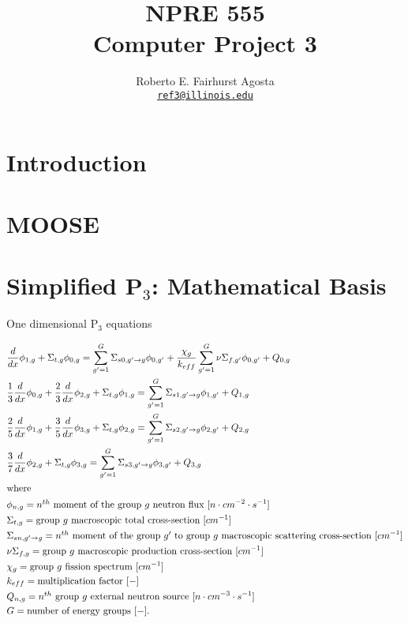 \documentclass[letterpaper]{article}
\author{Roberto E. Fairhurst Agosta
        \\ \href{mailto:ref3@illinois.edu}{\texttt{ref3@illinois.edu}}
}
\title{NPRE 555\\ Computer Project 3}
\begin{document}
\begin{titlepage}
\maketitle
\thispagestyle{empty}
\end{titlepage}

\section{Introduction}

\section{MOOSE}

\section{Simplified P$_3$: Mathematical Basis}

One dimensional P$_3$ equations
\cite{brantley_simplifiedP3_2000}

\begin{align}
    & \frac{d}{dx} \phi_{1,g} + \Sigma_{t,g} \phi_{0,g} = \sum_{g'=1}^G \Sigma_{s0,g' \rightarrow g} \phi_{0,g'} + \frac{\chi_g}{k_{eff}} \sum_{g'=1}^G \nu\Sigma_{f,g'} \phi_{0,g'} + Q_{0,g}  \label{eq:SP3-0} \\
    & \frac{1}{3} \frac{d}{dx} \phi_{0,g} + \frac{2}{3}\frac{d}{dx}\phi_{2,g} + \Sigma_{t,g} \phi_{1,g} = \sum_{g'=1}^G \Sigma_{s1,g' \rightarrow g} \phi_{1,g'} + Q_{1,g} \label{eq:SP3-1} \\
    & \frac{2}{5} \frac{d}{dx}\phi_{1,g} + \frac{3}{5}\frac{d}{dx}\phi_{3,g} + \Sigma_{t,g} \phi_{2,g} = \sum_{g'=1}^G \Sigma_{s2,g' \rightarrow g} \phi_{2,g'} + Q_{2,g} \label{eq:SP3-2} \\
    & \frac{3}{7}\frac{d}{dx}\phi_{2,g} + \Sigma_{t,g} \phi_{3,g} = \sum_{g'=1}^G \Sigma_{s3,g' \rightarrow g} \phi_{3,g'} + Q_{3,g} \label{eq:P3-3} \\
    \intertext{where}
    & \phi_{n,g} = \mbox{$n^{th}$ moment of the group $g$ neutron flux } [n \cdot cm^{-2} \cdot s^{-1}]  \notag \\
    & \Sigma_{t,g} = \mbox{group $g$ macroscopic total cross-section } [cm^{-1}]  \notag \\
	& \Sigma_{sn,g' \rightarrow g} = \mbox{$n^{th}$ moment of the group $g'$ to group $g$ macroscopic scattering cross-section } [cm^{-1}]  \notag \\
	& \nu\Sigma_{f,g} = \mbox{group $g$ macroscopic production cross-section } [cm^{-1}]  \notag \\
	& \chi_{g} = \mbox{group $g$ fission spectrum } [cm^{-1}]  \notag \\
	& k_{eff} = \mbox{multiplication factor } [-]  \notag \\
	& Q_{n,g} = \mbox{$n^{th}$ group $g$ external neutron source } [n \cdot cm^{-3} \cdot s^{-1}]  \notag \\
	& G = \mbox{number of energy groups } [-].  \notag
\end{align}
\end{document}
